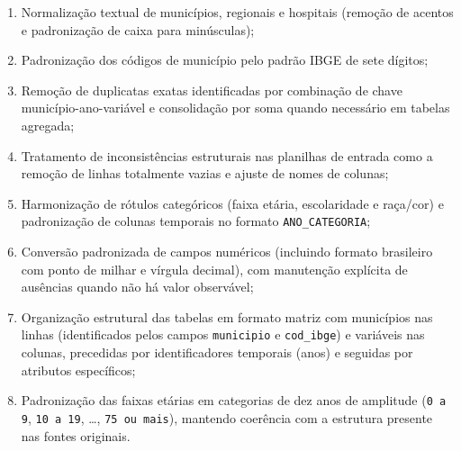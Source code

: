 \begin{enumerate}
    \item Normalização textual de municípios, regionais e hospitais (remoção de acentos e padronização de caixa para minúsculas);
    \item Padronização dos códigos de município pelo padrão IBGE de sete dígitos;
    \item Remoção de duplicatas exatas identificadas por combinação de chave município-ano-variável e consolidação por soma quando necessário em tabelas agregada;
    \item Tratamento de inconsistências estruturais nas planilhas de entrada como a remoção de linhas totalmente vazias e ajuste de nomes de colunas;
    \item Harmonização de rótulos categóricos (faixa etária, escolaridade e raça/cor) e padronização de colunas temporais no formato \texttt{ANO\_CATEGORIA};
    \item Conversão padronizada de campos numéricos (incluindo formato brasileiro com ponto de milhar e vírgula decimal), com manutenção explícita de ausências quando não há valor observável;
    \item Organização estrutural das tabelas em formato matriz com municípios nas linhas (identificados pelos campos \texttt{municipio} e \texttt{cod\_ibge}) e variáveis nas colunas, precedidas por identificadores temporais (anos) e seguidas por atributos específicos;
    \item Padronização das faixas etárias em categorias de dez anos de amplitude (\texttt{0 a 9}, \texttt{10 a 19}, \ldots, \texttt{75 ou mais}), mantendo coerência com a estrutura presente nas fontes originais.
\end{enumerate}



